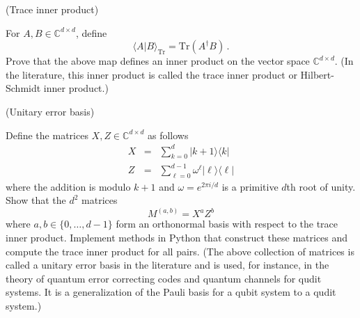 \documentclass[12pt]{article}
\renewcommand{\>}{\rangle}
\newcommand{\<}{\langle}
\newcommand{\C}{\mathbb{C}}
\begin{document}
\newpage


 (Trace inner product)

\medskip
\noindent
For $A,B\in\C^{d\times d}$, define
\[
\< A | B\>_{\mathrm{Tr}} = \mathrm{Tr}(A^\dagger B)\,.
\]
Prove that the above map defines an inner product on the vector space $\C^{d\times d}$. (In the literature, this inner product is called the trace inner product or Hilbert-Schmidt inner product.)

\newpage


 (Unitary error basis)

\noindent
Define the matrices $X,Z\in\C^{d\times d}$ as follows
\begin{eqnarray}
X & = & \sum_{k=0}^d |k+1\>\<k| \\
Z & = & \sum_{\ell=0}^{d-1} \omega^\ell |\ell\>\<\ell|
\end{eqnarray}
where the addition is modulo $k+1$ and $\omega=e^{2\pi i/d}$ is a primitive $d$th root of unity. Show that the $d^2$ matrices
\[
M^{(a,b)} = X^a Z^b
\]
where $a,b\in\{0,\ldots, d-1\}$ form an orthonormal basis with respect to the trace inner product. Implement methods in Python that construct these matrices and compute the trace inner product for all pairs. (The above collection of matrices is called a unitary error basis in the literature and is used, for instance, in the theory of quantum error correcting codes and quantum channels for qudit systems. It is a generalization of the Pauli basis for a qubit system to a qudit system.)
\end{document}
